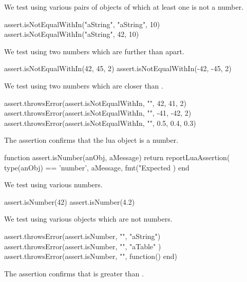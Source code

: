 
We test using various pairs of objects of which at least one is not a 
number. 

\startLuaTest
  assert.isNotEqualWithIn("aString", "aString", 10)
  assert.isNotEqualWithIn("aString", 42, 10)
\stopLuaTest
\stopTestCase


We test using two numbers which are further than  apart. 

\startLuaTest
  assert.isNotEqualWithIn(42, 45, 2)
  assert.isNotEqualWithIn(-42, -45, 2)
\stopLuaTest
\stopTestCase


We test using two numbers which are closer than . 

\startLuaTest
  assert.throwsError(assert.isNotEqualWithIn, "", 42, 41, 2)
  assert.throwsError(assert.isNotEqualWithIn, "", -41, -42, 2)
  assert.throwsError(assert.isNotEqualWithIn, "", 0.5, 0.4, 0.3)
\stopLuaTest
\stopTestSuite


The  assertion confirms that the lua object is a 
number. 

\startLuaCode
function assert.isNumber(anObj, aMessage)
  return reportLuaAssertion(
    type(anObj) == 'number',
    aMessage,
    fmt("Expected %
  )
end
\stopLuaCode


We test using various numbers.

\startLuaTest
  assert.isNumber(42)
  assert.isNumber(4.2)
\stopLuaTest
\stopTestCase


We test using various objects which are not numbers. 

\startLuaTest
  assert.throwsError(assert.isNumber, "", "aString")
  assert.throwsError(assert.isNumber, "", { "aTable" })
  assert.throwsError(assert.isNumber, "", function() end)
\stopLuaTest
\stopTestCase

\stopTestSuite


The  assertion confirms that  is greater than 
. 

